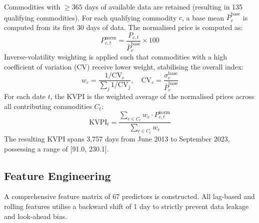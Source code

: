 Commodities with $\ge 365$ days of available data are retained (resulting in 135 qualifying commodities). For each qualifying commodity $c$, a base mean $\bar{P}_c^{\text{base}}$ is computed from its first 30 days of data. The normalised price is computed as:
\begin{equation}
P_{c,t}^{\text{norm}} = \frac{P_{c,t}}{\bar{P}_c^{\text{base}}} \times 100
\end{equation}
Inverse-volatility weighting is applied such that commodities with a high coefficient of variation (CV) receive lower weight, stabilising the overall index:
\begin{equation}
w_c = \frac{1 / \text{CV}_c}{\sum_{j} 1 / \text{CV}_j}, \quad \text{CV}_c = \frac{\sigma_c^{\text{base}}}{\bar{P}_c^{\text{base}}}
\end{equation}
For each date $t$, the KVPI is the weighted average of the normalised prices across all contributing commodities $C_t$:
\begin{equation}
\text{KVPI}_t = \frac{\sum_{c \in C_t} w_c \cdot P_{c,t}^{\text{norm}}}{\sum_{c \in C_t} w_c}
\end{equation}
The resulting KVPI spans 3,757 days from June 2013 to September 2023, possessing a range of [91.0, 230.1].

\subsection{Feature Engineering}
A comprehensive feature matrix of 67 predictors is constructed. All lag-based and rolling features utilise a backward shift of 1 day to strictly prevent data leakage and look-ahead bias.

